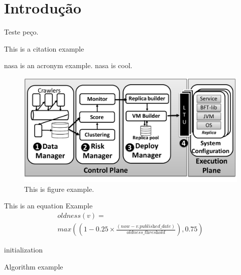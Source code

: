 \chapter{Introdução}
\label{chap:introduction}

Teste peço.


This is a citation example~\cite{Garcia:2019}

\gls{nasa} is an acronym example. \gls{nasa} is cool.

\begin{figure}[h]
\begin{center}
\includegraphics[width=\columnwidth]{images/figure_example.pdf}
\caption{This is figure example.}
\label{fig:overview}
\end{center}
\end{figure}



This is an equation Example
\begin{equation} 
\begin{split}
\textit{oldness}(v)=\\\textit{max}\left((1-0.25\times\frac{(\textit{now}-v.\textit{published\_date})}{\textit{oldness\_threshold}}), 0.75\right)
\label{eq:oldness}
\end{split}
\end{equation}

\begin{algorithm}[H]
\SetAlgoLined
{}
 initialization\;
 \caption{Algorithm example}
\end{algorithm}



